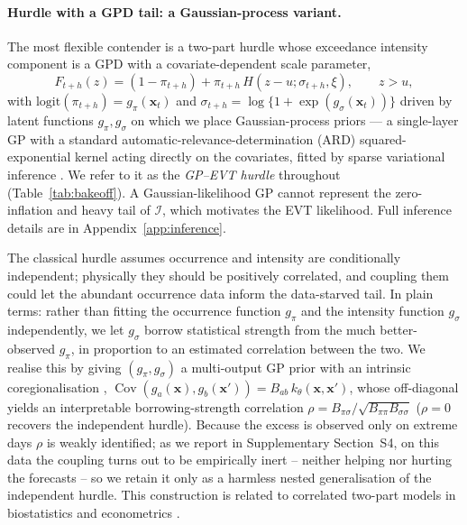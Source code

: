 \documentclass[11pt,a4paper]{article}
\newcommand{\Ind}{\mathcal{I}}                 %
\newcommand{\bx}{\bm{x}}
\begin{document}
\paragraph{Hurdle with a GPD tail: a Gaussian-process variant.} The most flexible
contender is a two-part hurdle whose exceedance intensity component is a GPD with a covariate-dependent scale parameter,
\begin{equation}\label{eq:hurdle-cdf}
F_{t+h}(z) = (1-\pi_{t+h}) + \pi_{t+h}\,H(z-u;\sigma_{t+h},\xi),\qquad z>u,
\end{equation}
with $\mathrm{logit}(\pi_{t+h})=g_\pi(\bx_t)$ and 
$\sigma_{t+h}= \log \{ 1 + \exp(g_\sigma(\bx_t)) \}$ driven by latent functions $g_\pi,
g_\sigma$ on which we place Gaussian-process priors --- a single-layer GP with a
standard automatic-relevance-determination (ARD) squared-exponential kernel \citep{rasmussen2006gpml} acting
directly on the covariates, fitted by sparse variational inference
\citep{salimbeni2017doubly}. We refer to it as the \emph{GP--EVT hurdle}
throughout (Table~\ref{tab:bakeoff}). A Gaussian-likelihood
GP cannot represent the zero-inflation and heavy tail of $\Ind$, which motivates
the EVT likelihood. Full inference details are in Appendix~\ref{app:inference}.

The classical
hurdle assumes occurrence and intensity are conditionally independent; physically
they should be positively correlated, and coupling them could let the abundant
occurrence data inform the data-starved tail. In
plain terms: rather than fitting the occurrence function $g_\pi$ and the
intensity function $g_\sigma$ independently, we let $g_\sigma$ borrow
statistical strength from the much better-observed $g_\pi$, in proportion to
an estimated correlation between the two. We realise
this by giving $(g_\pi,g_\sigma)$ a multi-output GP prior with an intrinsic
coregionalisation \citep{bonilla2008multitask,alvarez2012kernels},
$\operatorname{Cov}(g_a(\bx),g_b(\bx'))=B_{ab}\,k_\theta(\bx,\bx')$, whose
off-diagonal yields an interpretable borrowing-strength correlation
$\rho=B_{\pi\sigma}/\sqrt{B_{\pi\pi}B_{\sigma\sigma}}$ ($\rho=0$ recovers the
independent hurdle). Because the excess is observed only on extreme days $\rho$
is weakly identified; as we report in Supplementary Section~S4, on this data the
coupling turns out to be empirically inert -- neither helping nor hurting the
forecasts -- so we retain it only as a harmless nested generalisation of the
independent hurdle. This construction
is related to correlated two-part models in biostatistics and econometrics
\citep{olsen2001twopart,heckman1979selection}.
\end{document}
